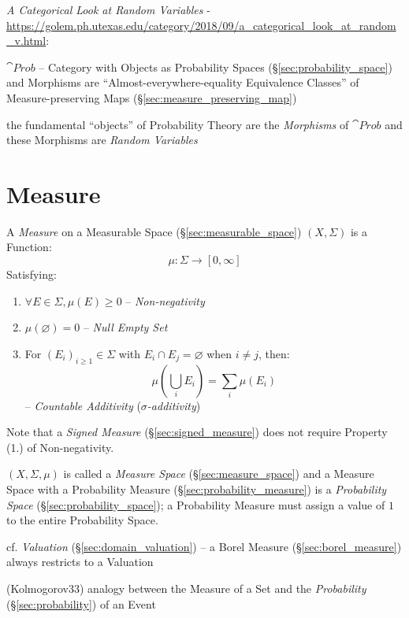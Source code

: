\emph{A Categorical Look at Random Variables} -
\url{https://golem.ph.utexas.edu/category/2018/09/a_categorical_look_at_random_v.html}:

$\cat{Prob}$ -- Category with Objects as Probability Spaces
(\S\ref{sec:probability_space}) and Morphisms are ``Almost-everywhere-equality
Equivalence Classes'' of Measure-preserving Maps
(\S\ref{sec:measure_preserving_map})

the fundamental ``objects'' of Probability Theory are the \emph{Morphisms} of
$\cat{Prob}$ and these Morphisms are \emph{Random Variables}



\section{Measure}\label{sec:measure}

A \emph{Measure} on a Measurable Space (\S\ref{sec:measurable_space})
$(X,\Sigma)$ is a Function:
\[
  \mu : \Sigma \rightarrow [0,\infty]
\]
Satisfying:
\begin{enumerate}
  \item $\forall E \in \Sigma, \mu(E) \geq 0$ -- \emph{Non-negativity}
  \item $\mu(\varnothing) = 0$ -- \emph{Null Empty Set}
  \item For $(E_i)_{i \geq 1} \in \Sigma$ with $E_i \cap E_j = \varnothing$
    when $i \neq j$, then:
    \[
      \mu (\bigcup_i E_i) = \sum_i \mu(E_i)
    \]
    -- \emph{Countable Additivity} (\emph{$\sigma$-additivity})
\end{enumerate}
Note that a \emph{Signed Measure} (\S\ref{sec:signed_measure}) does not require
Property (1.) of Non-negativity.

$(X,\Sigma,\mu)$ is called a \emph{Measure Space} (\S\ref{sec:measure_space})
and a Measure Space with a Probability Measure
(\S\ref{sec:probability_measure}) is a \emph{Probability Space}
(\S\ref{sec:probability_space}); a Probability Measure must assign a value of
$1$ to the entire Probability Space.

\fist cf. \emph{Valuation} (\S\ref{sec:domain_valuation}) -- a Borel Measure
(\S\ref{sec:borel_measure}) always restricts to a Valuation

(Kolmogorov33) analogy between the Measure of a Set and the \emph{Probability}
(\S\ref{sec:probability}) of an Event

